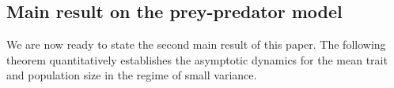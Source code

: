 \documentclass[]{article}
\newtheorem{theorem}{Theorem}
\theoremstyle{remark}
\begin{document}
\subsection*{Main result on the prey-predator model}
We are now ready to state the second main result of this paper. The following theorem quantitatively establishes the asymptotic dynamics for the mean trait and population size in the regime of small variance.
\end{document}
